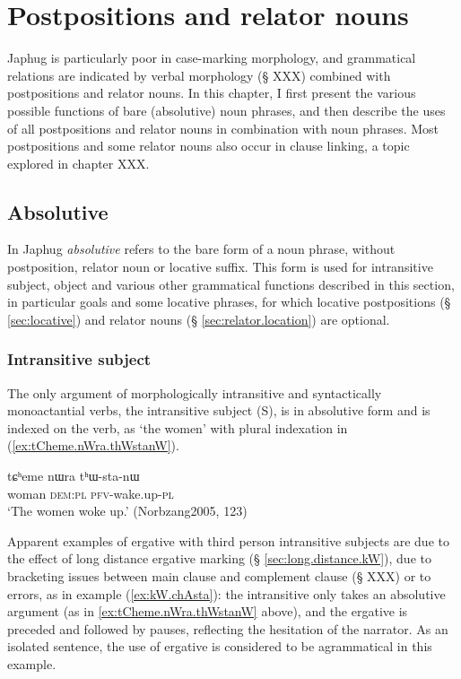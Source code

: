  \chapter{Postpositions and relator nouns} \label{chap:postpositions.relators}
Japhug is particularly poor in case-marking morphology, and grammatical relations are indicated by verbal morphology (§ XXX) combined with postpositions and relator nouns. In this chapter, I first present the various possible functions of bare (absolutive) noun phrases, and then describe the uses of all postpositions and relator nouns in combination with noun phrases. Most postpositions and some relator nouns also occur in clause linking, a topic explored in chapter XXX.
 

\section{Absolutive} \label{sec:absolutive}
In Japhug \textit{absolutive} refers to the bare form of a noun phrase, without postposition, relator noun or locative suffix. This form is used for intransitive subject, object and various other grammatical functions described in this section, in particular goals and some locative phrases, for which locative postpositions (§ \ref{sec:locative}) and relator nouns (§ \ref{sec:relator.location}) are optional.

\subsection{Intransitive subject} \label{sec:absolutive.S}
The only argument of morphologically intransitive and syntactically monoactantial verbs, the intransitive subject (S), is in absolutive form and is indexed on the verb, as  `the women' with plural indexation in (\ref{ex:tCheme.nWra.thWstanW}). 

\begin{exe}
\ex \label{ex:tCheme.nWra.thWstanW}
\gll tɕʰeme nɯra tʰɯ-sta-nɯ  \\
woman \textsc{dem}:\textsc{pl} \textsc{pfv}-wake.up-\textsc{pl} \\
\glt  `The women woke up.'  (Norbzang2005, 123)
\end{exe}

Apparent examples of ergative  with third person intransitive subjects are due to the effect of long distance ergative marking (§ \ref{sec:long.distance.kW}), due to bracketing issues between main clause and complement clause (§ XXX) or to errors, as in example (\ref{ex:kW.chAsta}): the intransitive  only takes an absolutive argument (as in \ref{ex:tCheme.nWra.thWstanW} above), and the ergative  is preceded and followed by pauses, reflecting the hesitation of the narrator. As an isolated sentence, the use of ergative is considered to be agrammatical in this example.

